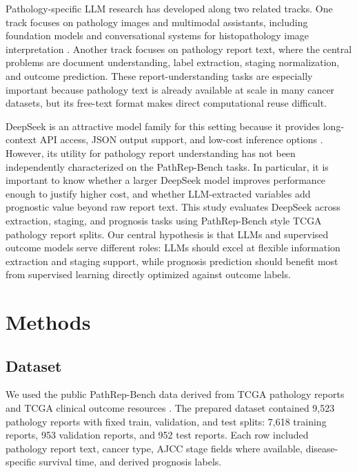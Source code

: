 \documentclass[pdflatex,sn-vancouver-num]{sn-jnl}
\begin{document}
Pathology-specific LLM research has developed along two related tracks. One track focuses on pathology images and multimodal assistants, including foundation models and conversational systems for histopathology image interpretation \cite{lu2024pathchat}. Another track focuses on pathology report text, where the central problems are document understanding, label extraction, staging normalization, and outcome prediction. These report-understanding tasks are especially important because pathology text is already available at scale in many cancer datasets, but its free-text format makes direct computational reuse difficult.

DeepSeek is an attractive model family for this setting because it provides long-context API access, JSON output support, and low-cost inference options \cite{deepseekdocs,deepseekpricing}. However, its utility for pathology report understanding has not been independently characterized on the PathRep-Bench tasks. In particular, it is important to know whether a larger DeepSeek model improves performance enough to justify higher cost, and whether LLM-extracted variables add prognostic value beyond raw report text. This study evaluates DeepSeek across extraction, staging, and prognosis tasks using PathRep-Bench style TCGA pathology report splits. Our central hypothesis is that LLMs and supervised outcome models serve different roles: LLMs should excel at flexible information extraction and staging support, while prognosis prediction should benefit most from supervised learning directly optimized against outcome labels.

\section{Methods}\label{sec:methods}

\subsection{Dataset}\label{subsec:dataset}

We used the public PathRep-Bench data derived from TCGA pathology reports and TCGA clinical outcome resources \cite{pathrepbench,rosenthaldataset,liu2018tcga,weinstein2013tcga}. The prepared dataset contained 9,523 pathology reports with fixed train, validation, and test splits: 7,618 training reports, 953 validation reports, and 952 test reports. Each row included pathology report text, cancer type, AJCC stage fields where available, disease-specific survival time, and derived prognosis labels.
\end{document}
